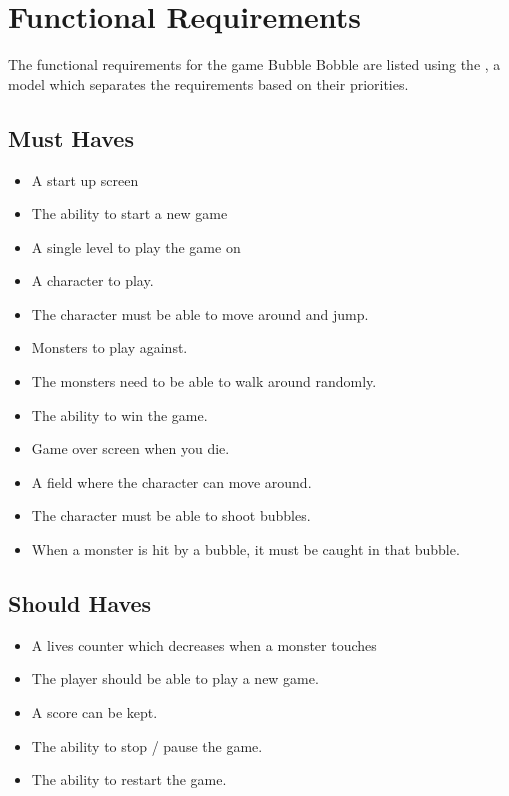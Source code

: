 \chapter{Functional Requirements}

The functional requirements for the game Bubble Bobble are listed using the , a model which separates the requirements based on their priorities.



\section{Must Haves}

\begin{itemize}
\itemsep0em 
 	\item A start up screen
  	\item The ability to start a new game
  	\item A single level to play the game on
  	\item A character to play.
  	\item The character must be able to move around and jump.
  	\item Monsters to play against.
  	\item The monsters need to be able to walk around randomly.
 	\item The ability to win the game.
 	\item Game over screen when you die.
 	\item A field where the character can move around.
 	\item The character must be able to shoot bubbles.
 	\item When a monster is hit by a bubble, it must be caught in that bubble.
\end{itemize}

\section{Should Haves}

\begin{itemize}
\itemsep0em 
 \item A lives counter which decreases when a monster touches 
 \item The player should be able to play a new game. 
 \item A score can be kept. 
 \item The ability to stop / pause the game.
 \item The ability to restart the game.
\end{itemize}

